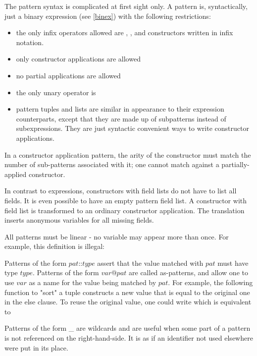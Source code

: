 The pattern syntax is complicated at first sight only. A pattern is, syntactically, just a binary expression (see \autoref{binex}) with the following restrictions:
\begin{itemize}
\item the only infix operators allowed are , , \sym{:} and constructors written in infix notation.
\item only constructor applications are allowed
\item no partial applications are allowed
\item the only unary operator is \sym{!}
\item pattern tuples and lists are similar in appearance to their expression counterparts, except that they are made up of subpatterns instead of subexpressions. They are just syntactic convenient ways to write constructor applications.
\end{itemize}

In a constructor application pattern, the arity of the constructor must match the number of sub-patterns associated with it; one cannot match against a partially-applied constructor.

In contrast to expressions, constructors with field lists do not have to list all fields. It is even possible to have an empty pattern field list. A constructor with field list is transformed to an ordinary constructor application. The translation inserts anonymous variables for all missing fields.

All patterns must be linear - no variable may appear more than once. For example, this definition is illegal:

Patterns of the form $pat$::$type$ assert that the value matched with $pat$ must have type $type$.
Patterns of the form
$var$@$pat$
are called as-patterns, and allow one to use
$var$
as a name for the
value being matched by $pat$. For example, the following function to "sort" a tuple
constructs a new value that is equal to the original one in the else clause. To reuse the original value, one could write
which is equivalent to

Patterns of the form \_ are wildcards and are useful when some part of a pattern is not referenced on
the right-hand-side. It is as if an identifier not used elsewhere were put in its place.

